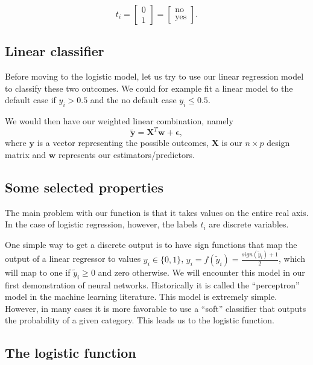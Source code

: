 \documentclass[%
oneside,                 %
final,                   %
10pt]{article}
\begin{document}
\[
t_i = \begin{bmatrix} 0 \\  1 \end{bmatrix}
= \begin{bmatrix} \mathrm{no}\\  \mathrm{yes} \end{bmatrix}.
\]



\subsection{Linear classifier}

Before moving to the logistic model, let us try to use our linear
regression model to classify these two outcomes. We could for example
fit a linear model to the default case if $y_i > 0.5$ and the no
default case $y_i \leq 0.5$.

We would then have our 
weighted linear combination, namely 
\begin{equation}
\boldsymbol{\tilde{y}} = \boldsymbol{X}^T\boldsymbol{w} +  \boldsymbol{\epsilon},
\end{equation}
where $\boldsymbol{y}$ is a vector representing the possible outcomes, $\boldsymbol{X}$ is our
$n\times p$ design matrix and $\boldsymbol{w}$ represents our estimators/predictors.

\subsection{Some selected properties}

The main problem with our function is that it takes values on the
entire real axis. In the case of logistic regression, however, the
labels $t_i$ are discrete variables. 

One simple way to get a discrete output is to have sign
functions that map the output of a linear regressor to values $y_i \in \{ 0, 1 \}$,
$y_i = f(\tilde{y}_i)=\frac{sign(\tilde{y}_i)+1}{2}$, which will map to one if $\tilde{y}_i\ge 0$ and zero otherwise. 
We will encounter this model in our first demonstration of neural networks. Historically it is called the ``perceptron'' model in the machine learning
literature. This model is extremely simple. However, in many cases it is more
favorable to use a ``soft'' classifier that outputs
the probability of a given category. This leads us to the logistic function.


\subsection{The logistic function}
\end{document}
